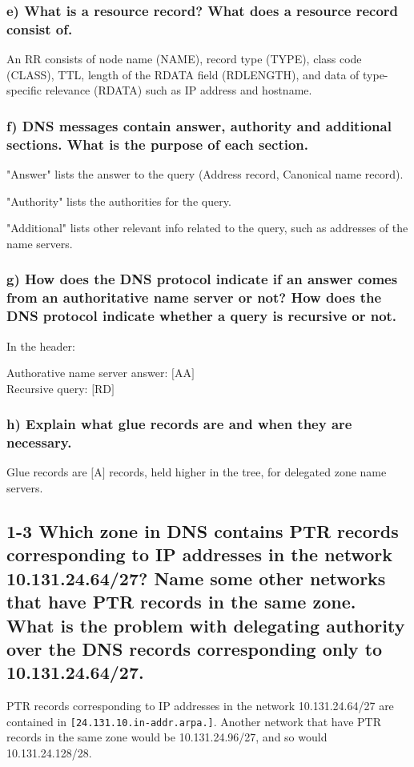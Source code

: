 \subsubsection{e) What is a resource record? What does a resource record consist of.}
An RR consists of node name (NAME), record type (TYPE), class code (CLASS), TTL, length of the RDATA field (RDLENGTH), and data of type-specific relevance (RDATA) such as IP address and hostname.

\subsubsection{f) DNS messages contain answer, authority and additional sections. What is the purpose of each section.}
"Answer" lists the answer to the query (Address record, Canonical name record).

"Authority" lists the authorities for the query.

"Additional" lists other relevant info related to the query, such as addresses of the name servers.
\subsubsection{g) How does the DNS protocol indicate if an answer comes from an authoritative name server or not? How does the DNS protocol indicate whether a query is recursive or not.}
In the header:

Authorative name server answer: $[$AA$]$\\
Recursive query: $[$RD$]$

\subsubsection{h) Explain what glue records are and when they are necessary.}
Glue records are $[$A$]$ records, held higher in the tree, for delegated zone name servers.

\subsection{1-3 Which zone in DNS contains PTR records corresponding to IP addresses in the network 10.131.24.64/27? Name some other networks that have PTR records in the same zone. What is the problem with delegating authority over the DNS records corresponding only to 10.131.24.64/27.}
PTR records corresponding to IP addresses in the network 10.131.24.64/27 are contained in \verb=[24.131.10.in-addr.arpa.]=. Another network that have PTR records in the same zone would be 10.131.24.96/27, and so would 10.131.24.128/28.

